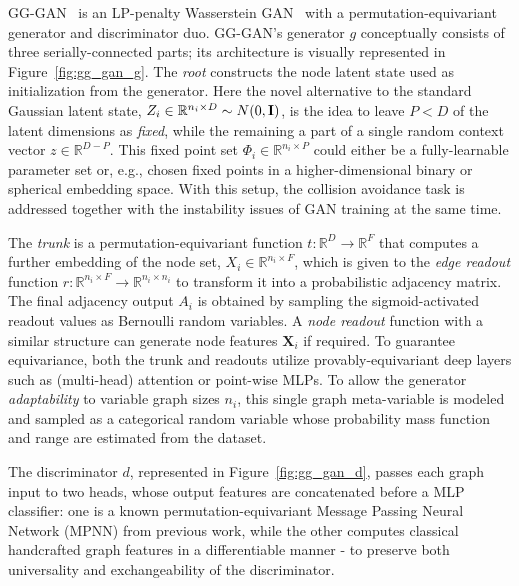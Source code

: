 GG-GAN~\cite{krawczuk_gg-gan_2020} is an LP-penalty Wasserstein GAN~\cite{gulrajani_improved_2017} with a permutation-equivariant generator and discriminator duo. GG-GAN's generator $g$ conceptually consists of three serially-connected parts; its architecture is visually represented in Figure~\ref{fig:gg_gan_g}. The \emph{root} constructs the node latent state used as initialization from the generator. Here the novel alternative to the standard Gaussian latent state, $Z_i \in \mathbb{R}^{n_i \times D} \sim N\mathopen{}\left(0,\mathbf{I}\right)$, is the idea to leave $P<D$ of the latent dimensions as \emph{fixed}, while the remaining a part of a single random context vector $z \in \mathbb{R}^{D-P}$. This fixed point set $\Phi_i \in \mathbb{R}^{n_i \times P}$ could either be a fully-learnable parameter set or, e.g., chosen fixed points in a higher-dimensional binary or spherical embedding space. With this setup, the collision avoidance task is addressed together with the instability issues of GAN training at the same time. 

The \emph{trunk} is a permutation-equivariant function $t: \mathbb{R}^D \to \mathbb{R}^{F}$ that computes a further embedding of the node set, $X_i \in \mathbb{R}^{n_i \times F}$, which is given to the \emph{edge readout} function $r: \mathbb{R}^{n_i \times F} \to \mathbb{R}^{n_i \times n_i}$ to transform it into a probabilistic adjacency matrix. The final adjacency output $A_i$ is obtained by sampling the sigmoid-activated readout values as Bernoulli random variables. A \emph{node readout} function with a similar structure can generate node features $\mathbf{X}_i$ if required. To guarantee equivariance, both the trunk and readouts utilize provably-equivariant deep layers such as (multi-head) attention or point-wise MLPs. To allow the generator \emph{adaptability} to variable graph sizes $n_i$, this single graph meta-variable is modeled and sampled as a categorical random variable whose probability mass function and range are estimated from the dataset.

The discriminator $d$, represented in Figure~\ref{fig:gg_gan_d}, passes each graph input to two heads, whose output features are concatenated before a MLP classifier: one is a known permutation-equivariant Message Passing Neural Network (MPNN) from previous work, while the other computes classical handcrafted graph features in a differentiable manner - to preserve both universality and exchangeability of the discriminator.

